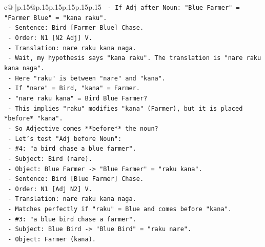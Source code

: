 \documentclass{article}
\begin{document}
{\begin{supertabular}{c@{$\;$}|p{.15\linewidth}@{}p{.15\linewidth}p{.15\linewidth}p{.15\linewidth}p{.15\linewidth}p{.15\linewidth}}
{{{\texttt{                           {-} If Adj after Noun: "Blue Farmer" = "Farmer Blue" = "kana raku".} \\
\texttt{                           {-} Sentence: Bird {[}Farmer Blue{]} Chase.} \\
\texttt{                           {-} Order: N1 {[}N2 Adj{]} V.} \\
\texttt{                           {-} Translation: nare raku kana naga.} \\
\texttt{                           {-} Wait, my hypothesis says "kana raku". The translation is "nare raku kana naga".} \\
\texttt{                           {-} Here "raku" is between "nare" and "kana".} \\
\texttt{                           {-} If "nare" = Bird, "kana" = Farmer.} \\
\texttt{                           {-} "nare raku kana" = Bird Blue Farmer?} \\
\texttt{                           {-} This implies "raku" modifies "kana" (Farmer), but it is placed *before* "kana".} \\
\texttt{                           {-} So Adjective comes **before** the noun?} \\
\texttt{                           {-} Let's test "Adj before Noun":} \\
\texttt{                             {-} \#4: "a bird chase a blue farmer".} \\
\texttt{                               {-} Subject: Bird (nare).} \\
\texttt{                               {-} Object: Blue Farmer {-}> "Blue Farmer" = "raku kana".} \\
\texttt{                               {-} Sentence: Bird {[}Blue Farmer{]} Chase.} \\
\texttt{                               {-} Order: N1 {[}Adj N2{]} V.} \\
\texttt{                               {-} Translation: nare raku kana naga.} \\
\texttt{                               {-} Matches perfectly if "raku" = Blue and comes before "kana".} \\
\texttt{                             {-} \#3: "a blue bird chase a farmer".} \\
\texttt{                               {-} Subject: Blue Bird {-}> "Blue Bird" = "raku nare".} \\
\texttt{                               {-} Object: Farmer (kana).} \\
}}}
\end{supertabular}}
\end{document}
